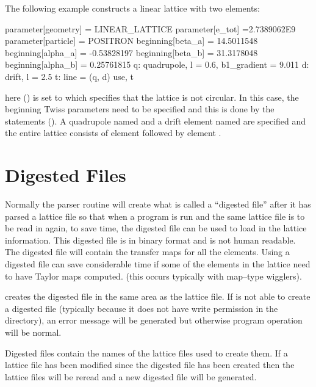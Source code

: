 The following example constructs a linear lattice with two elements: 
\begin{example}
  parameter[geometry] = LINEAR_LATTICE
  parameter[e_tot] =2.7389062E9
  parameter[particle] = POSITRON
  beginning[beta_a] = 14.5011548
  beginning[alpha_a] = -0.53828197
  beginning[beta_b] = 31.3178048
  beginning[alpha_b] = 0.25761815
  q: quadrupole, l = 0.6, b1_gradient = 9.011
  d: drift, l = 2.5
  t: line = (q, d)
  use, t 
\end{example}
here  () is set to 
which specifies that the lattice is not circular. In this case, the beginning 
Twiss parameters need to be specified and this is done by the 
statements (). A quadrupole named 
and a drift element named  are specified
and the entire lattice consists of element  followed by element .

\section{Digested Files}
\label{s:digested}

Normally the \bmad parser routine will create what is called a
``digested file'' after it has parsed a lattice file so that when a
program is run and the same lattice file is to be read in again, to save
time, the digested file can be used to load in the lattice information.
This digested file is in binary format and is not human readable. The
digested file will contain the transfer maps for all the elements. 
Using a digested file can save considerable time if some of the
elements in the lattice need to have Taylor maps computed.
(this occurs typically with map--type wigglers).

\bmad creates the digested file in the same area as the lattice file.
If \bmad is not able to create a digested file (typically because it
does not have write permission in the directory), an error message will
be generated but otherwise program operation will be normal.

Digested files contain the names of the lattice files used to create
them. If a lattice file has been modified since the digested file has
been created then the lattice files will be reread and a new
digested file will be generated. 

